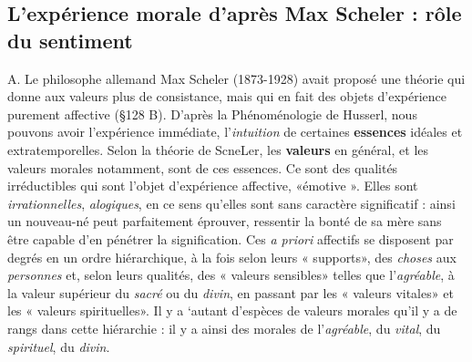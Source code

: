 \subsection{L'expérience morale d’après Max Scheler : rôle du sentiment}%
A. Le philosophe allemand Max Scheler (1873-1928)
avait proposé une théorie qui donne aux valeurs plus de consistance,
mais qui en fait des objets d'expérience purement affective (\S 128 B).
D’après la Phénoménologie de Husserl, nous pouvons avoir l’expérience
immédiate, l’{\it intuition} de certaines {\bf essences} idéales et extratemporelles.
Selon la théorie de ScneLer, les {\bf valeurs} en général,
et les valeurs morales notamment, sont de ces essences. Ce sont
des qualités irréductibles qui sont l’objet d’expérience affective,
«émotive ». Elles sont {\it irrationnelles}, {\it alogiques}, en ce sens qu’elles
sont sans caractère significatif : ainsi un nouveau-né peut parfaitement
éprouver, ressentir la bonté de sa mère sans être capable d’en
pénétrer la signification. Ces {\it a priori} affectifs se disposent par degrés
en un ordre hiérarchique, à la fois selon leurs « supports», des {\it choses}
aux {\it personnes} et, selon leurs qualités, des « valeurs sensibles» telles
que l’{\it agréable}, à la valeur supérieur du {\it sacré} ou du {\it divin}, en passant
par les « valeurs vitales» et les « valeurs spirituelles». Il y a ‘autant
d’espèces de valeurs morales qu’il y a de rangs dans cette hiérarchie :
il y a ainsi des morales de l’{\it agréable}, du {\it vital}, du {\it spirituel}, du {\it divin}.

